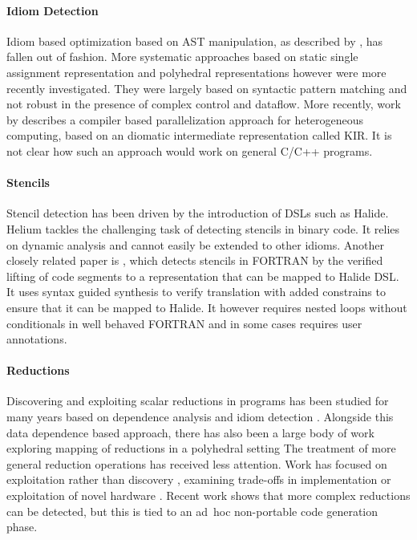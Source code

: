 \paragraph*{Idiom Detection}
    Idiom based optimization based on AST manipulation, as described by
    \citet{Pinter:1994:POP:177492.177494}, has fallen out of fashion.
    More systematic approaches based on static single assignment representation
    \cite{lattner2004llvm} and polyhedral representations
    \cite{benabderrahmane2010polyhedral} however were more recently
    investigated.
    They were largely based on syntactic pattern matching and not robust in the
    presence of complex control and dataflow.
    More recently, work by \citet{Andion2015Compilation} describes a compiler
    based parallelization approach for heterogeneous computing, based on an
    diomatic intermediate representation called KIR.  
    It is not clear how such an approach would work on general C/C++ programs.

\paragraph*{Stencils}
    Stencil detection has been driven by the introduction of DSLs such as
    Halide.  Helium \cite{Mendis2015Helium} tackles the challenging task
    of detecting stencils in binary code. It relies
    on dynamic analysis and cannot easily be extended to
    other idioms.
    Another closely related paper is \cite{Kamil2016Verified}, which detects stencils in FORTRAN by the
    verified lifting of code segments to a representation that can be
    mapped to Halide DSL.  It uses syntax guided synthesis to verify
    translation with added constrains to ensure that it can be mapped to
    Halide.
    It however requires nested loops  without conditionals in well behaved FORTRAN
    and in some cases requires user annotations.

\paragraph*{Reductions}
    Discovering and exploiting scalar reductions in programs has been
    studied for many years based on dependence analysis and idiom detection
     \cite{fisher1994parallelizing,pottenger1995idiom,suganuma1996detection}.
    Alongside this data dependence based approach, there has also been a
     large body of work exploring mapping of reductions in a
     polyhedral setting \cite{jouvelot1989unified,redon1994scheduling}
     The treatment of
    more general reduction operations has received  less attention.
    Work has focused on exploitation rather than discovery
    \cite{Gutierrez:2000,gutierrez2003optimization,gutierrez2008analytical}, examining trade-offs in implementation \cite{yu2006adaptive}
     or exploitation of novel hardware \cite{ravi2010compiler,Huo2011HiPC}.
    Recent work \cite{ginsbach2017discovery} shows that more complex reductions can be 
    detected, but this is tied to  an  ad~hoc non-portable code generation phase. 

